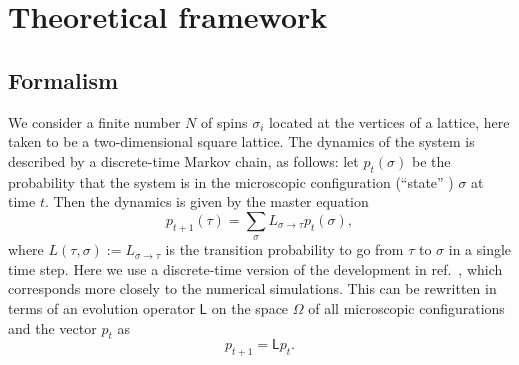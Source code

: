 \documentclass[10pt]{article}
\newcommand{\defeq}{:=}
\newcommand{\LL}{\mathsf{L}}
\renewcommand{\L}[2]{L_{#2 \to #1}}  %
\newcommand{\p}{p}
\newcommand{\transp}{^{\text{\small T}}}
\begin{document}

% 

\section{Theoretical framework}

\subsection{Formalism}

We consider a finite number $N$ of spins $\sigma_i$ located at the
vertices of a lattice, here taken to be a two-dimensional square lattice.  The
dynamics of the system is described by a discrete-time Markov chain, as follows: let $p_t(\sigma)$ be the probability that the system is in the microscopic configuration (``state'' ) $\sigma$ at time $t$.
Then the dynamics is given by the
master equation
\begin{equation}
p_{t+1}(\tau) = \sum_{\sigma} \L{\tau}{\sigma} p_t(\sigma), 
\end{equation}
where $L(\tau, \sigma) \defeq \L{\tau}{\sigma}$ is the transition probability to go from $\tau$ 
to $\sigma$ in a single time step.  Here we use a discrete-time version of 
the development in ref.~\cite{LarraldeLeyvrazSandersJStatMech2006}, which corresponds more closely to the numerical simulations.
This can be rewritten in terms of an evolution operator $\LL$ on the space $\Omega$ of all microscopic configurations
and the vector $\p_t$ as
\begin{equation}
 \p_{t+1} = \LL \p_t.
\end{equation}
\end{document}

